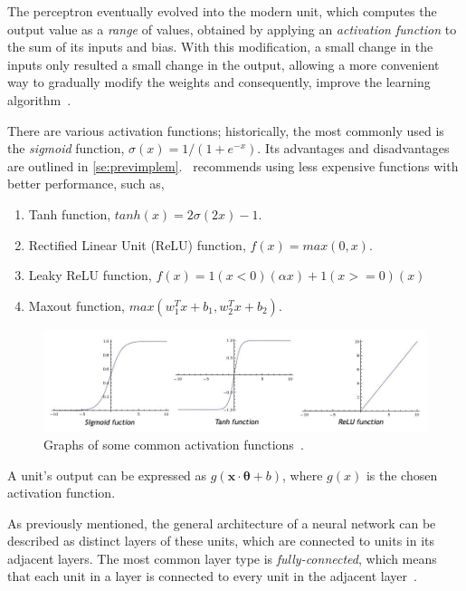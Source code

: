 The perceptron eventually evolved into the modern unit, which computes the output value as a \textit{range} of values, obtained by applying an \textit{activation function} to the sum of its inputs and bias. With this modification, a small change in the inputs only resulted a small change in the output, allowing a more convenient way to gradually modify the weights and consequently, improve the learning algorithm~\cite{Nie16}.

There are various activation functions; historically, the most commonly used is the \textit{sigmoid} function, $\sigma(x) = 1/(1+e^{-x})$. Its advantages and disadvantages are outlined in \ref{se:previmplem}.~\cite{Kar16} recommends using less expensive functions with better performance, such as,
\begin{enumerate}
\item Tanh function, $tanh(x) = 2\sigma(2x)-1$.
\item Rectified Linear Unit (ReLU) function, $f(x)=max(0,x)$.
\item Leaky ReLU function, $f(x) = 1(x < 0)(\alpha x) + 1(x >= 0)(x)$
\item Maxout function, $max(w_{1}^{T}x + b_{1}, w_{2}^{T}x+b_{2})$.
\end{enumerate}

\begin{figure}
  \includegraphics[width=\linewidth]{activation-functions.jpg}
  \caption{Graphs of some common activation functions~\cite{Kar16}.}
  \label{fig:activation-graphs}
\end{figure}

A unit's output can be expressed as $g(\boldsymbol{x} \cdot \boldsymbol{\theta} + b)$, where $g(x)$ is the chosen activation function.

As previously mentioned, the general architecture of a neural network can be described as distinct layers of these units, which are connected to units in its adjacent layers. The most common layer type is \textit{fully-connected}, which means that each unit in a layer is connected to every unit in the adjacent layer~\cite{Nor14}. 

